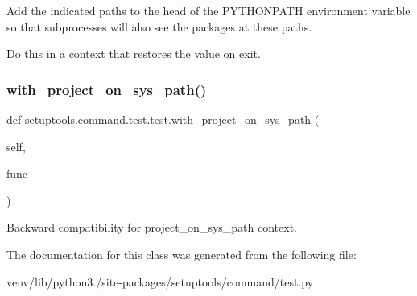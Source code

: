 \begin{DoxyVerb}Add the indicated paths to the head of the PYTHONPATH environment
variable so that subprocesses will also see the packages at
these paths.

Do this in a context that restores the value on exit.
\end{DoxyVerb}
 \mbox{\label{classsetuptools_1_1command_1_1test_1_1test_a6031bb41469603a2f2ddc6a0ce6070e6}} 
\subsubsection{\texorpdfstring{with\+\_\+project\+\_\+on\+\_\+sys\+\_\+path()}{with\_project\_on\_sys\_path()}}
{\footnotesize\ttfamily def setuptools.\+command.\+test.\+test.\+with\+\_\+project\+\_\+on\+\_\+sys\+\_\+path (\begin{DoxyParamCaption}\item[{}]{self,  }\item[{}]{func }\end{DoxyParamCaption})}

\begin{DoxyVerb}Backward compatibility for project_on_sys_path context.
\end{DoxyVerb}
 

The documentation for this class was generated from the following file\+:\begin{DoxyCompactItemize}
\item 
venv/lib/python3./site-\/packages/setuptools/command/test.\+py\end{DoxyCompactItemize}
